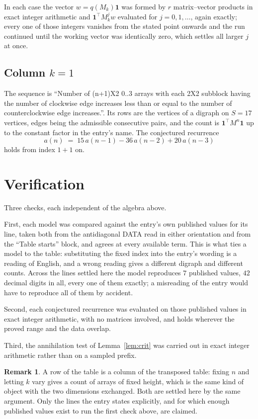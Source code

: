 \documentclass[11pt,a4paper]{article}
\theoremstyle{plain}
\theoremstyle{definition}
\newtheorem{remark}[theorem]{Remark}
\begin{document}
In each case the vector $w=q(M_k)\mathbf{1}$ was formed by $r$ matrix--vector products in
exact integer arithmetic and $\mathbf{1}^{\!\top}M_k^{j}w$ evaluated for $j=0,1,\dots$,
again exactly; every one of those integers vanishes from the stated point onwards and the run
continued until the working vector was identically zero, which settles all larger $j$ at once.

\subsection*{Column $k$$=1$}
The sequence is ``Number of (n+1)X2 0..3 arrays with each 2X2 subblock having the number of clockwise edge increases less than or equal to the number of counterclockwise edge increases.''. Its rows are the vertices of a digraph on
$S=17$ vertices, edges being the admissible consecutive pairs, and the count is
$\mathbf{1}^{\!\top}M^{n}\mathbf{1}$ up to the constant factor in the entry's name.
The conjectured recurrence
\[
a(n)\;=\;15\,a(n-1) - 36\,a(n-2) + 20\,a(n-3)
\]
holds from index $1+1$ on.

\section{Verification}

Three checks, each independent of the algebra above.

First, each model was compared against the entry's own published values for its line, taken
both from the antidiagonal DATA read in either orientation and from the ``Table starts''
block, and agrees at every available term. This is what ties a model to the table:
substituting the fixed index into the entry's wording is a reading of English, and a wrong
reading gives a different digraph and different counts. Across the lines settled here the
model reproduces $7$ published values, $42$ decimal digits in all, every one of
them exactly; a misreading of the entry would have to reproduce all of them by accident.

Second, each conjectured recurrence was evaluated on those published values in exact
integer arithmetic, with no matrices involved, and holds wherever the proved range and the
data overlap.

Third, the annihilation test of Lemma~\ref{lem:crit} was carried out in exact integer
arithmetic rather than on a sampled prefix.

\begin{remark}
A row of the table is a column of the transposed table: fixing $n$ and letting $k$ vary gives a
count of arrays of fixed height, which is the same kind of object with the two dimensions
exchanged. Both are settled here by the same argument. Only the lines the entry states
explicitly, and for which enough published values exist to run the first check above, are
claimed.
\end{remark}
\end{document}
